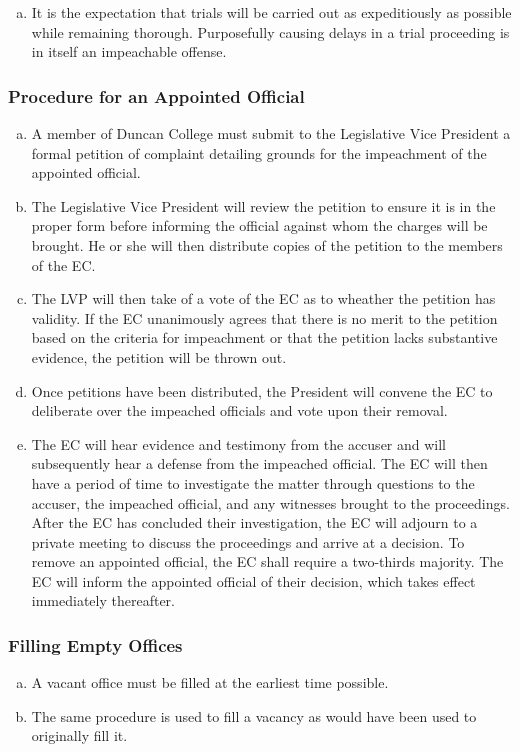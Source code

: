 \documentclass[USletter,12pt]{article}
\begin{document}
\begin{enumerate}[(a)]
\item It is the expectation that trials will be carried out as expeditiously as possible while remaining thorough.  Purposefully causing delays in a trial proceeding is in itself an impeachable offense.
\end{enumerate}

\subsubsection{Procedure for an Appointed Official}
\begin{enumerate}[(a)]
\item A member of Duncan College must submit to the Legislative Vice President a formal petition of complaint detailing grounds for the impeachment of the appointed official.
\item The Legislative Vice President will review the petition to ensure it is in the proper form before informing the official against whom the charges will be brought.  He or she will then distribute copies of the petition to the members of the EC.
\item The LVP will then take of a vote of the EC as to wheather the petition has validity.  If the EC unanimously agrees that there is no merit to the petition based on the criteria for impeachment or that the petition lacks substantive evidence, the petition will be thrown out.
\item Once petitions have been distributed, the President will convene the EC to deliberate over the impeached officials and vote upon their removal.
\item The EC will hear evidence and testimony from the accuser and will subsequently hear a defense from the impeached official.  The EC will then have a period of time to investigate the matter through questions to the accuser, the impeached official, and any witnesses brought to the proceedings.  After the EC has concluded their investigation, the EC will adjourn to a private meeting to discuss the proceedings and arrive at a decision. To remove an appointed official, the EC shall require a two-thirds majority.  The EC will inform the appointed official of their decision, which takes effect immediately thereafter.
\end{enumerate}

\subsubsection{Filling Empty Offices}
\begin{enumerate}[(a)]
\item A vacant office must be filled at the earliest time possible.
\item The same procedure is used to fill a vacancy as would have been used to originally fill it.
\end{enumerate}
\end{document}
